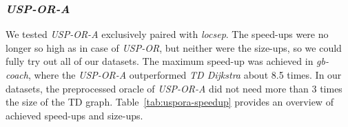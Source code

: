 		\begin{figure}[H]
		\centering
		\end{figure}

	\subsubsection{\textit{USP-OR-A}}
	
		\noindent We tested \textit{USP-OR-A} exclusively paired with \textit{locsep}. The speed-ups were no longer so high as in case of \textit{USP-OR}, but neither were the size-ups, so we could fully try out all of our datasets. The maximum speed-up was achieved in \textit{gb-coach}, where the \textit{USP-OR-A} outperformed \textit{TD Dijkstra} about 8.5 times. In our datasets, the preprocessed oracle of \textit{USP-OR-A} did not need more than 3 times the size of the TD graph. Table~\ref{tab:uspora-speedup} provides an overview of achieved speed-ups and size-ups.
	

